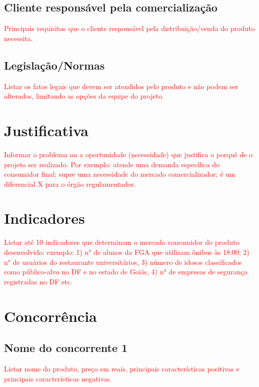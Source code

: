 \subsection{Cliente responsável pela comercialização}

\textcolor{red}{Principais requisitos que o cliente responsável pela distribuição/venda do produto necessita.}

\subsection{Legislação/Normas}

\textcolor{red}{Listar os fatos legais que devem ser atendidos pelo produto e não podem ser alterados, limitando as opções da equipe do projeto.}

\section{Justificativa}

\textcolor{red}{Informar o problema ou a oportunidade (necessidade) que justifica o porquê de o projeto ser realizado. Por exemplo: atende uma demanda específica do consumidor final; supre uma necessidade do mercado comercializador; é um diferencial X para o órgão regulamentador.}

\section{Indicadores}

\textcolor{red}{Listar até 10 indicadores que determinam o mercado consumidor do produto desenvolvido: exemplo: 1) n° de alunos da FGA que utilizam ônibus às 18:00; 2) n° de usuários do restaurante universitários, 3) número de idosos classificados como público-alvo no DF e no estado de Goiás, 4) n° de empresas de segurança registradas no DF etc.}

\section{Concorrência}

\subsection{Nome do concorrente 1}

\textcolor{red}{Listar nome do produto, preço em reais, principais características
positivas e principais características negativas.}

